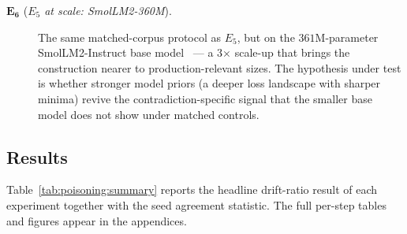 \documentclass[11pt,a4paper]{article}
\begin{document}
\begin{description}
  \item[$\mathbf{E_6}$ (\emph{$E_5$ at scale: SmolLM2\nobreakdash-360M}).]
    The same matched\nobreakdash-corpus protocol as $E_5$, but on
    the $361$M\nobreakdash-parameter SmolLM2\nobreakdash-Instruct
    base model~\cite{smollm2} — a 3$\times$ scale\nobreakdash-up
    that brings the construction nearer to production\nobreakdash-relevant
    sizes.  The hypothesis under test is whether stronger model
    priors (a deeper loss landscape with sharper minima) revive
    the contradiction\nobreakdash-specific signal that the smaller
    base model does not show under matched controls.
\end{description}

\subsection{Results}
\label{sec:poisoning:results}

Table~\ref{tab:poisoning:summary} reports the headline drift\nobreakdash-ratio
result of each experiment together with the seed agreement statistic.
The full per\nobreakdash-step tables and figures appear in the
appendices.
\end{document}
